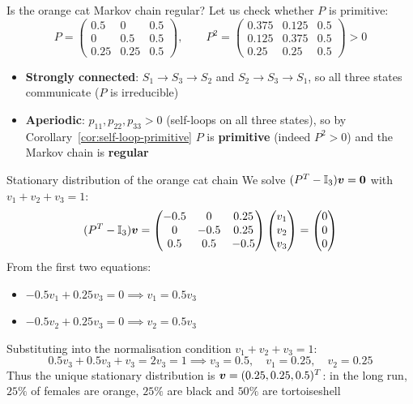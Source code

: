 \documentclass[aspectratio=169]{beamer}\usepackage[]{graphicx}\usepackage[]{xcolor}
\begin{document}
\begin{frame}{Is the orange cat Markov chain regular?}
Let us check whether $P$ is primitive:
\[
P = \begin{pmatrix}
0.5  & 0    & 0.5 \\
0    & 0.5  & 0.5 \\
0.25 & 0.25 & 0.5
\end{pmatrix},
\qquad
P^2 = \begin{pmatrix}
0.375 & 0.125 & 0.5 \\
0.125 & 0.375 & 0.5 \\
0.25  & 0.25  & 0.5
\end{pmatrix} > 0
\]
\vfill
\begin{itemize}
\item \textbf{Strongly connected}: $S_1 \to S_3 \to S_2$ and $S_2 \to S_3 \to S_1$, so all three states communicate ($P$ is irreducible)
\item \textbf{Aperiodic}: $p_{11}, p_{22}, p_{33} > 0$ (self-loops on all three states), so by Corollary~\ref{cor:self-loop-primitive} $P$ is \textbf{primitive} (indeed $P^2 > 0$) and the Markov chain is \textbf{regular}
\end{itemize}
\end{frame}

\begin{frame}{Stationary distribution of the orange cat chain}
We solve $(P^T - \II_3)\bv = \b0$ with $v_1 + v_2 + v_3 = 1$:
\[
(P^T - \mathbb{I}_3)\bm{v} = \begin{pmatrix}
-0.5 & 0    & 0.25 \\
0    & -0.5 & 0.25 \\
0.5  & 0.5  & -0.5
\end{pmatrix}
\begin{pmatrix} v_1 \\ v_2 \\ v_3 \end{pmatrix}
= \begin{pmatrix} 0 \\ 0 \\ 0 \end{pmatrix}
\]
From the first two equations:
\begin{itemize}
\item $-0.5 v_1 + 0.25 v_3 = 0 \implies v_1 = 0.5 v_3$
\item $-0.5 v_2 + 0.25 v_3 = 0 \implies v_2 = 0.5 v_3$
\end{itemize}
Substituting into the normalisation condition $v_1 + v_2 + v_3 = 1$:
\[
0.5 v_3 + 0.5 v_3 + v_3 = 2 v_3 = 1 \implies v_3 = 0.5, \quad v_1 = 0.25, \quad v_2 = 0.25
\]
\vfill
Thus the unique stationary distribution is $\bm{v} = (0.25, 0.25, 0.5)^T$: in the long run, $25\%$ of females are orange, $25\%$ are black and $50\%$ are tortoiseshell
\end{frame}
\end{document}
